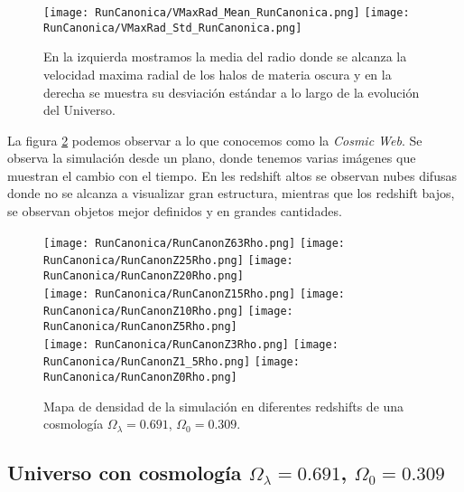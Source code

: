 \begin{figure}[ht!]
    \centering
    \texttt{[image: RunCanonica/VMaxRad\_Mean\_RunCanonica.png]}
    \texttt{[image: RunCanonica/VMaxRad\_Std\_RunCanonica.png]}
    \caption[Media y desviación estándar del Radio de la mitad de la masa de un Universo $\Omega_\lambda = 0.691 $, $\Omega_0 = 0.309$]{\footnotesize En la izquierda mostramos la media del radio donde se alcanza la velocidad maxima radial de los halos de materia oscura y en la derecha se muestra su desviación estándar a lo largo de la evolución del Universo.}
    \label{fig:VMaxRadStatsCanonRun}
\end{figure}



La figura \ref{fig:CanonRunDensityMap} podemos observar a lo que conocemos como la \emph{Cosmic Web}. Se observa la simulación desde un plano, donde tenemos varias imágenes que muestran el cambio con el tiempo. En les redshift altos se observan nubes difusas donde no se alcanza a visualizar gran estructura, mientras que los redshift bajos, se observan objetos mejor definidos y en grandes cantidades.


\begin{figure}[ht!]
    \centering

    \texttt{[image: RunCanonica/RunCanonZ63Rho.png]}   %
    \texttt{[image: RunCanonica/RunCanonZ25Rho.png]}   %
    \texttt{[image: RunCanonica/RunCanonZ20Rho.png]}   %
    \\
    \texttt{[image: RunCanonica/RunCanonZ15Rho.png]}   %
    \texttt{[image: RunCanonica/RunCanonZ10Rho.png]}   %
    \texttt{[image: RunCanonica/RunCanonZ5Rho.png]}    %
    \\
    \texttt{[image: RunCanonica/RunCanonZ3Rho.png]}    %
    \texttt{[image: RunCanonica/RunCanonZ1\_5Rho.png]}  %
    \texttt{[image: RunCanonica/RunCanonZ0Rho.png]}    %
    \caption[Mapa de densidad de un Universo $\Omega_\lambda = 0.691 $, $\Omega_0 = 0.309$ en en diferentes redshift]{ \footnotesize Mapa de densidad de la simulación en diferentes redshifts de una cosmología $\Omega_\lambda = 0.691 $, $\Omega_0 = 0.309$. }
    \label{fig:CanonRunDensityMap}
\end{figure}








\subsection{ Universo con cosmología  \texorpdfstring{$\Omega_\lambda = 0.691$, $\Omega_0 = 0.309$ }{Omega lambda = 0.691, Omega 0 = 0.309} }


